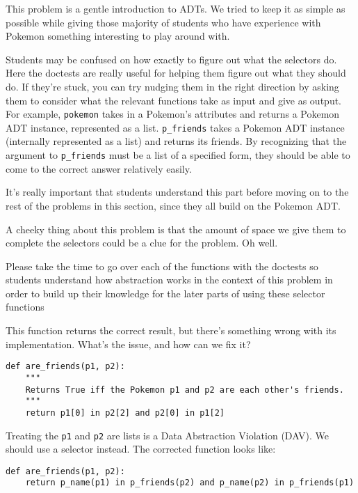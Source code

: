 \begin{questionmeta}
This problem is a gentle introduction to ADTs. We tried to keep it as simple as possible while giving those majority of students who
have experience with Pokemon something interesting to play around with. 

Students may be confused on how exactly to figure out what the selectors do. Here the doctests are really useful for helping them 
figure out what they should do. If they're stuck, you can try nudging them in the right direction by asking them to consider what
the relevant functions take as input and give as output. For example, \lstinline{pokemon} takes in a Pokemon's attributes and 
returns a Pokemon ADT instance, represented as a list. \lstinline{p_friends} takes a Pokemon ADT instance (internally represented
as a list) and returns its friends. By recognizing that the argument to \lstinline{p_friends} must be a list of a specified form,
they should be able to come to the correct answer relatively easily. 

It's really important that students understand this part before moving on to the rest of the problems in this section, since they
all build on the Pokemon ADT. 

A cheeky thing about this problem is that the amount of space we give them to complete the selectors could be a clue for the problem.
Oh well. 

Please take the time to go over each of the functions with the doctests so students understand how abstraction works in the context of this problem
in order to build up their knowledge for the later parts of using these selector functions
\end{questionmeta}
    
    \begin{blocksection}
    \question This function returns the correct result, but there's something wrong
    with its implementation. What's the issue, and how can we fix it?
    
    \begin{lstlisting}
def are_friends(p1, p2):
    """
    Returns True iff the Pokemon p1 and p2 are each other's friends.
    """
    return p1[0] in p2[2] and p2[0] in p1[2]
    \end{lstlisting}
    \begin{solution}[0.5in]
    Treating the \lstinline{p1} and \lstinline{p2} are lists is a Data Abstraction Violation (DAV).
    We should use a selector instead.
    The corrected function looks like:
    \begin{lstlisting}
def are_friends(p1, p2):
    return p_name(p1) in p_friends(p2) and p_name(p2) in p_friends(p1)
    \end{lstlisting}
    \end{solution}
    \end{blocksection}


